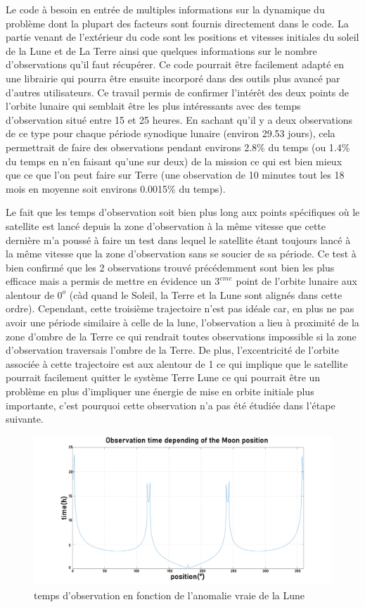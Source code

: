 \documentclass[12pt]{article} %
\begin{document}
		Le code à besoin en entrée de multiples informations sur la dynamique du problème dont la plupart des facteurs sont fournis directement dans le code. La partie venant de l'extérieur du code sont les positions et vitesses initiales du soleil de la Lune et de La Terre ainsi que quelques informations sur le nombre d'observations qu'il faut récupérer.
		Ce code pourrait être facilement adapté en une librairie qui pourra être ensuite incorporé dans des outils plus avancé par d'autres utilisateurs.
		Ce travail permis de confirmer l'intérêt des deux points de l'orbite lunaire qui semblait être les plus intéressants avec des temps d'observation situé entre 15 et 25 heures. En sachant qu'il y a deux observations de ce type pour chaque période synodique lunaire (environ 29.53 jours), cela permettrait de faire des observations pendant environs 2.8\% du temps (ou 1.4\% du temps en n'en faisant qu'une sur deux) de la mission ce qui est bien mieux que ce que l'on peut faire sur Terre (une observation de 10 minutes tout les 18 mois en moyenne soit environs 0.0015\% du temps).
		
		Le fait que les temps d'observation soit bien plus long aux points spécifiques où le satellite est lancé depuis la zone d'observation à la même vitesse que cette dernière m'a poussé à faire un test dans lequel le satellite étant toujours lancé à la même vitesse que la zone d'observation sans se soucier de sa période. Ce test à bien confirmé que les 2 observations trouvé précédemment sont bien les plus efficace mais a permis de mettre en évidence un $3^{eme}$ point de l'orbite lunaire aux alentour de $0^o$ (càd quand le Soleil, la Terre et la Lune sont alignés dans cette ordre). Cependant, cette troisième trajectoire n'est pas idéale car, en plus ne pas avoir une période similaire à celle de la lune, l'observation a lieu à proximité de la zone d'ombre de la Terre ce qui rendrait toutes observations impossible si la zone d'observation traversais l'ombre de la Terre. De plus, l'excentricité de l'orbite associée à cette trajectoire est aux alentour de 1 ce qui implique que le satellite pourrait facilement quitter le système Terre Lune ce qui pourrait être un problème en plus d'impliquer une énergie de mise en orbite initiale plus importante, c'est pourquoi cette observation n'a pas été étudiée dans l'étape suivante.
		\begin{figure}[h]
			\includegraphics[width=1\textwidth]{images/observation_Obs.png}
			\caption{temps d'observation en fonction de l'anomalie vraie de la Lune}
		\end{figure}
		
\end{document}
